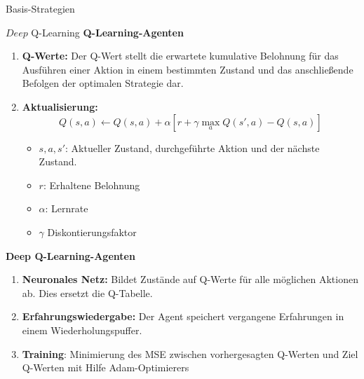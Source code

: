 \documentclass[final]{beamer}
\newlength{\colwidth}
\begin{document}
\begin{frame}[t]
\begin{columns}[t]
\begin{column}{\colwidth}
\begin{block}{Basis-Strategien}
  \end{block}
  

  \begin{block}{\(Deep\) Q-Learning}
    \textbf{Q-Learning-Agenten}
    \begin{enumerate}
      \item \textbf{Q-Werte:} Der Q-Wert stellt die erwartete kumulative Belohnung für das Ausführen einer Aktion in einem bestimmten 
      Zustand und das anschließende Befolgen der optimalen Strategie dar.
      \item \textbf{Aktualisierung:} \begin{equation*} Q(s, a)\leftarrow Q(s, a) + \alpha [r + \gamma \max_{a}Q(s', a) - Q(s, a)]
                                      \end{equation*}
            \begin{itemize}
              \item $s,a,s'$: Aktueller Zustand, durchgeführte Aktion und der nächste Zustand.
              \item $r$: Erhaltene Belohnung
              \item $\alpha$: Lernrate 
              \item $\gamma$ Diskontierungsfaktor
            \end{itemize}
  \end{enumerate}

  \textbf{Deep Q-Learning-Agenten}

  \begin{enumerate}
    \item \textbf{Neuronales Netz:} Bildet Zustände auf Q-Werte für alle möglichen Aktionen ab. Dies ersetzt die Q-Tabelle.
    \item \textbf{Erfahrungswiedergabe:} Der Agent speichert vergangene Erfahrungen in einem Wiederholungspuffer.
    \item \textbf{Training}: Minimierung des MSE zwischen vorhergesagten Q-Werten und Ziel Q-Werten mit Hilfe Adam-Optimierers
  \end{enumerate}


\end{block}
\end{column}
\end{columns}
\end{frame}
\end{document}
